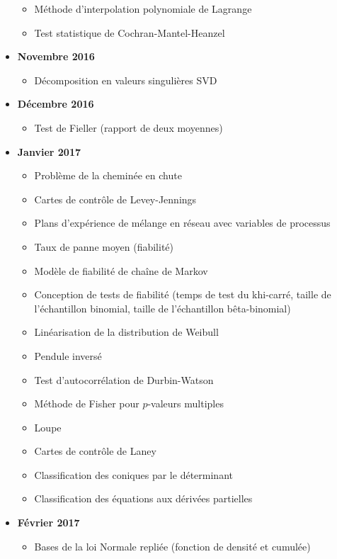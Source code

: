 \begin{itemize}
\begin{itemize}[noitemsep]
				\item Méthode d'interpolation polynomiale de Lagrange
				\item Test statistique de Cochran-Mantel-Heanzel
			\end{itemize}
		\item \textbf{Novembre 2016}
			\begin{itemize}[noitemsep]
				\item Décomposition en valeurs singulières SVD
			\end{itemize}
		\item \textbf{Décembre 2016}
			\begin{itemize}[noitemsep]
				\item Test de Fieller (rapport de deux moyennes)
			\end{itemize}
		\item \textbf{Janvier 2017}
			\begin{itemize}[noitemsep]
				\item Problème de la cheminée en chute
				\item Cartes de contrôle de Levey-Jennings
				\item Plans d'expérience de mélange en réseau avec variables de processus
				\item Taux de panne moyen (fiabilité)
				\item Modèle de fiabilité de chaîne de Markov
				\item Conception de tests de fiabilité (temps de test du khi-carré, taille de l'échantillon binomial, taille de l'échantillon bêta-binomial)
				\item Linéarisation de la distribution de Weibull
				\item Pendule inversé
				\item Test d'autocorrélation de Durbin-Watson
				\item Méthode de Fisher pour $p$-valeurs multiples
				\item Loupe
				\item Cartes de contrôle de Laney
				\item Classification des coniques par le déterminant	
				\item Classification des équations aux dérivées partielles
			\end{itemize}
		\item \textbf{Février 2017}
			\begin{itemize}[noitemsep]
				\item Bases de la loi Normale repliée (fonction de densité et cumulée)

\end{itemize}
\end{itemize}
